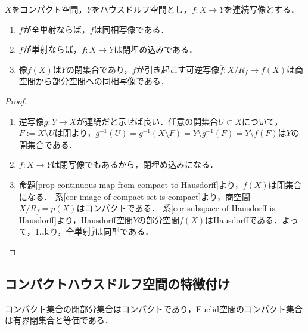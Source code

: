 \documentclass[uplatex,dvipdfmx]{jsreport}
\begin{document}
\begin{corollary}\label{cor-Compact-Hausdorff}
    $X$をコンパクト空間，$Y$をハウスドルフ空間とし，$f:X\to Y$を連続写像とする．
    \begin{enumerate}
        \item $f$が全単射ならば，$f$は同相写像である．
        \item $f$が単射ならば，$f:X\to Y$は閉埋め込みである．
        \item 像$f(X)$は$Y$の閉集合であり，$f$が引き起こす可逆写像$\overline{f}:X/R_f\to f(X)$は商空間から部分空間への同相写像である．
    \end{enumerate}
\end{corollary}
\begin{proof}\mbox{}
    \begin{enumerate}
        \item 逆写像$g:Y\to X$が連続だと示せば良い．任意の開集合$U\subset X$について，$F:=X\setminus U$は閉より，$g^{-1}(U)=g^{-1}(X\setminus F)=Y\setminus g^{-1}(F)=Y\setminus f(F)$は$Y$の開集合である．
        \item $f:X\to Y$は閉写像でもあるから，閉埋め込みになる．
        \item 命題\ref{prop-continuous-map-from-compact-to-Hausdorff}より，$f(X)$は閉集合になる．
        系\ref{cor-image-of-compact-set-is-compact}より，商空間$X/R_f=p(X)$はコンパクトである．
        系\ref{cor-subspace-of-Hausdorff-is-Hausdorff}より，Hausdorff空間$Y$の部分空間$f(X)$はHausdorffである．よって，1.より，全単射$\overline{f}$は同型である．
    \end{enumerate}
\end{proof}

\subsection{コンパクトハウスドルフ空間の特徴付け}

\begin{tcolorbox}[colframe=ForestGreen, colback=ForestGreen!10!white,breakable,colbacktitle=ForestGreen!40!white,coltitle=black,fonttitle=\bfseries\sffamily,
title=]
    コンパクト集合の閉部分集合はコンパクトであり，Euclid空間のコンパクト集合は有界閉集合と等価である．
\end{tcolorbox}
\end{document}
